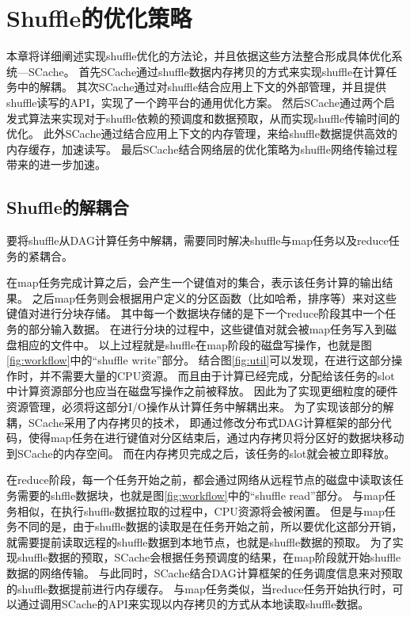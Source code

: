 
\chapter{Shuffle的优化策略}
\label{chap:optimization}

本章将详细阐述实现shuffle优化的方法论，并且依据这些方法整合形成具体优化系统---SCache。
首先SCache通过shuffle数据内存拷贝的方式来实现shuffle在计算任务中的解耦。
其次SCache通过对shuffle结合应用上下文的外部管理，并且提供shuffle读写的API，实现了一个跨平台的通用优化方案。
然后SCache通过两个启发式算法来实现对于shuffle依赖的预调度和数据预取，从而实现shuffle传输时间的优化。
此外SCache通过结合应用上下文的内存管理，来给shuffle数据提供高效的内存缓存，加速读写。
最后SCache结合网络层的优化策略为shuffle网络传输过程带来的进一步加速。

\section{Shuffle的解耦合}

要将shuffle从DAG计算任务中解耦，需要同时解决shuffle与map任务以及reduce任务的紧耦合。

在map任务完成计算之后，会产生一个键值对的集合，表示该任务计算的输出结果。
之后map任务则会根据用户定义的分区函数（比如哈希，排序等）来对这些键值对进行分块存储。
其中每一个数据块存储的是下一个reduce阶段其中一个任务的部分输入数据。
在进行分块的过程中，这些键值对就会被map任务写入到磁盘相应的文件中。
以上过程就是shuffle在map阶段的磁盘写操作，也就是图\ref{fig:workflow}中的“shuffle write”部分。
结合图\ref{fig:util}可以发现，在进行这部分操作时，并不需要大量的CPU资源。
而且由于计算已经完成，分配给该任务的slot中计算资源部分也应当在磁盘写操作之前被释放。
因此为了实现更细粒度的硬件资源管理，必须将这部分I/O操作从计算任务中解耦出来。
为了实现该部分的解耦，SCache采用了内存拷贝的技术，
即通过修改分布式DAG计算框架的部分代码，使得map任务在进行键值对分区结束后，通过内存拷贝将分区好的数据块移动到SCache的内存空间。
而在内存拷贝完成之后，该任务的slot就会被立即释放。

在reduce阶段，每一个任务开始之前，都会通过网络从远程节点的磁盘中读取该任务需要的shffle数据块，也就是图\ref{fig:workflow}中的“shuffle read”部分。
与map任务相似，在执行shuffle数据拉取的过程中，CPU资源将会被闲置。
但是与map任务不同的是，由于shuffle数据的读取是在任务开始之前，所以要优化这部分开销，就需要提前读取远程的shuffle数据到本地节点，也就是shuffle数据的预取。
为了实现shuffle数据的预取，SCache会根据任务预调度的结果，在map阶段就开始shuffle数据的网络传输。
与此同时，SCache结合DAG计算框架的任务调度信息来对预取的shuffle数据提前进行内存缓存。
与map任务类似，当reduce任务开始执行时，可以通过调用SCache的API来实现以内存拷贝的方式从本地读取shuffle数据。

